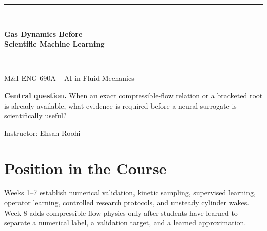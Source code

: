 \documentclass[11pt]{article}
\begin{document}
\hypersetup{pageanchor=false}
\begin{titlepage}
\centering\vspace*{0.9cm}
{\color{black}\rule{\textwidth}{2pt}}\\[0.5cm]
{\Huge\bfseries Gas Dynamics Before\\[0.18cm]Scientific Machine Learning\par}
\vspace{0.35cm}{\Large Exact Relations, Branch-Aware Inversion, and Evidence-Based Surrogates\par}
\vspace{0.35cm}{\large Week 8 Extension Lecture Notes\par}
\vspace{0.5cm}{\color{black}\rule{\textwidth}{2pt}}\\[0.9cm]
{\Large M\&I-ENG 690A -- AI in Fluid Mechanics\par}
\vspace{0.25cm}{\large Summer 2026\par}
\vfill
\begin{tcolorbox}[colback=lightblue,colframe=blue,width=0.92\textwidth]
\textbf{Central question.} When an exact compressible-flow relation or a bracketed root is already available, what evidence is required before a neural surrogate is scientifically useful?
\end{tcolorbox}
\vfill{\large Instructor: Ehsan Roohi\par}
\end{titlepage}

\hypersetup{pageanchor=true}
\tableofcontents\newpage
{}

\section{Position in the Course}
Weeks 1--7 establish numerical validation, kinetic sampling, supervised learning,
operator learning, controlled research protocols, and unsteady cylinder wakes.
Week 8 adds compressible-flow physics only after students have learned to separate
a numerical label, a validation target, and a learned approximation.
\end{document}
